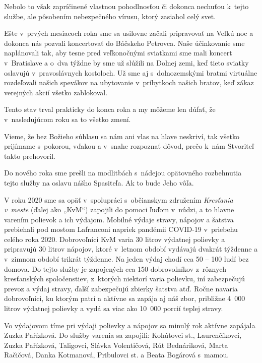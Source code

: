 Nebolo to však zapríčinené vlastnou pohodlnosťou či dokonca nechuťou k~tejto službe, ale pôsobením nebezpečného vírusu, ktorý zasiahol celý svet.

Ešte v~prvých mesiacoch roka sme sa usilovne začali pripravovať na Veľkú noc a dokonca nás pozvali koncertovať do Báčskeho Petrovca. Naše účinkovanie  sme naplánovali tak, aby tesne pred veľkonočnými sviatkami sme mali koncert v~Bratislave a o~dva týždne by sme už slúžili na Dolnej zemi, keď tieto sviatky oslavujú v~pravoslávnych kostoloch. Už sme aj s~dolnozemskými bratmi virtuálne  rozdeľovali našich spevákov na ubytovanie v~príbytkoch našich bratov, keď zákaz verejných akcií všetko zablokoval.

Tento stav trval prakticky do konca roka a my môžeme len dúfať, že v~nasledujúcom roku sa to všetko zmení.

Vieme, že bez Božieho súhlasu sa nám ani vlas na hlave neskriví, tak všetko prijímame s~pokorou, vďakou a v~snahe rozpoznať dôvod, prečo k~nám Stvoriteľ takto prehovoril.

Do nového roka sme prešli na modlitbách s~nádejou opätovného rozbehnutia tejto služby na oslavu nášho Spasiteľa. Ak to bude Jeho vôľa.



V roku 2020 sme sa opäť v~spolupráci s~občianskym združením {\it Kresťania v~meste} (ďalej ako „KvM“) zapojili do pomoci ľuďom v~núdzi, a to hlavne varením polievok a ich výdajom.  Mobilné výdaje stravy,  nápojov a šatstva prebiehali pod mostom Lafranconi napriek pandémii COVID-19 v~priebehu celého roka 2020. Dobrovoľníci KvM varia 30 litrov výdatnej polievky a pripravujú 30 litrov nápojov, ktoré v~letnom období vydávajú dvakrát týždenne a v~zimnom období trikrát týždenne. Na jeden výdaj chodí cca 50 -- 100 ľudí bez domova. Do tejto služby je zapojených cca 150 dobrovoľníkov z~rôznych kresťanských spoločenstiev, z~ktorých niektorí varia polievku, iní zabezpečujú prevoz a výdaj stravy, ďalší zabezpečujú zbierky šatstva atď. Ročne navaria dobrovoľníci, ku ktorým patrí a aktívne sa zapája aj náš zbor, približne 4~000 litrov výdatnej polievky a vydá sa viac ako 10~000 porcií teplej stravy.

Vo výdajovom tíme pri výdaji polievky a nápojov sa minulý rok aktívne zapájala Zuzka Pařízková. Do služby varenia sa zapojili: Kohútovci st., Laurenčíkovci, Zuzka Pařízková, Taligovci, Slávka Volentičová, Rút Bednáriková, Marta Račičová, Danka Kotmanová, Pribulovci st. a Beata Bogárová s~mamou.

